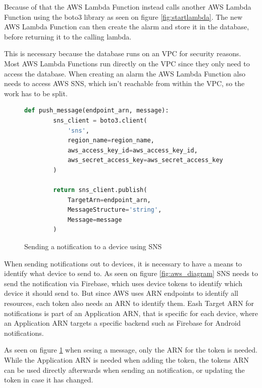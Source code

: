 Because of that the AWS Lambda Function instead calls another AWS Lambda Function using the boto3 library as seen on figure \ref{fig:startlambda}. The new AWS Lambda Function can then create the alarm and store it in the database, before returning it to the calling lambda.

This is necessary because the database runs on an VPC for security reasons. Most AWS Lambda Functions run directly on the VPC since they only need to access the database. When creating an alarm the AWS Lambda Function also needs to access AWS SNS, which isn't reachable from within the VPC, so the work has to be split.

\begin{figure}[H]
    \centering
    \begin{lstlisting}[language=Python]
    def push_message(endpoint_arn, message):
        sns_client = boto3.client(
            'sns',
            region_name=region_name,
            aws_access_key_id=aws_access_key_id,
            aws_secret_access_key=aws_secret_access_key
        )
    
        return sns_client.publish(
            TargetArn=endpoint_arn,
            MessageStructure='string',
            Message=message
        )
    \end{lstlisting}
    \caption{Sending a notification to a device using SNS}
    \label{fig:sns_notification}
\end{figure}

When sending notifications out to devices, it is necessary to have a means to identify what device to send to. As seen on figure \ref{fig:aws_diagram} SNS needs to send the notification via Firebase, which uses device tokens to identify which device it should send to. But since AWS uses ARN endpoints to identify all resources, each token also needs an ARN to identify them. Eash Target ARN for notifications is part of an Application ARN, that is specific for each device, where an Application ARN targets a specific backend such as Firebase for Android notifications.

As seen on figure \ref{fig:sns_notification} when sesing a message, only the ARN for the token is needed. While the Application ARN is needed when adding the token, the tokens ARN can be used directly afterwards when sending an notification, or updating the token in case it has changed.

